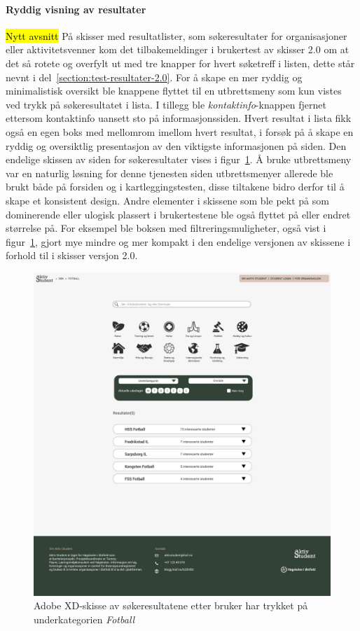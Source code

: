 \paragraph{Ryddig visning av resultater}
\hl{Nytt avsnitt}
På skisser med resultatlister, som søkeresultater for organisasjoner eller aktivitetsvenner kom det tilbakemeldinger i brukertest av skisser 2.0 om at det så rotete og overfylt ut med tre knapper for hvert søketreff i listen, dette står nevnt i del~\ref{section:test-resultater-2.0}. For å skape en mer ryddig og minimalistisk oversikt ble knappene flyttet til en utbrettsmeny som kun vistes ved trykk på søkeresultatet i lista. I tillegg ble {\em kontaktinfo}-knappen fjernet ettersom kontaktinfo uansett sto på informasjonssiden. Hvert resultat i lista fikk også en egen boks med mellomrom imellom hvert resultat, i forsøk på å skape en ryddig og oversiktlig presentasjon av den viktigste informasjonen på siden. Den endelige skissen av siden for søkeresultater vises i figur~\ref{fig:3-3-resultater-filtrering}. Å bruke utbrettsmeny var en naturlig løsning for denne tjenesten siden utbrettsmenyer allerede ble brukt både på forsiden og i kartleggingstesten, disse tiltakene bidro derfor til å skape et konsistent design. Andre elementer i skissene som ble pekt på som dominerende eller ulogisk plassert i brukertestene ble også flyttet på eller endret størrelse på. For eksempel ble boksen med filtreringsmuligheter, også vist i figur~\ref{fig:3-3-resultater-filtrering}, gjort mye mindre og mer kompakt i den endelige versjonen av skissene i forhold til i skisser versjon 2.0. 


\begin{figure}[H]
\centering
\includegraphics[width=.7\textwidth]{Illustrasjoner/Skisser-pdf/3.0/3-3-resultater-fotball.pdf}
\caption{Adobe XD-skisse av søkeresultatene etter bruker har trykket på underkategorien {\em Fotball}}
\label{fig:3-3-resultater-filtrering}
\end{figure}

